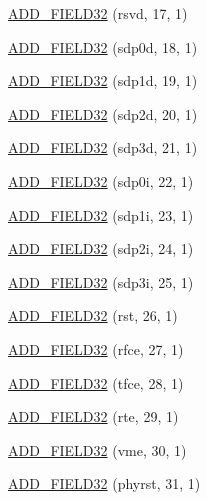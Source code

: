\begin{DoxyCompactItemize}
\item 
\hyperlink{structiGbReg_1_1Regs_1_1CTRL_aefe3435f854e5eab707963b9c17ee7dd}{ADD\_\-FIELD32} (rsvd, 17, 1)
\item 
\hyperlink{structiGbReg_1_1Regs_1_1CTRL_af883c5c203e7a3b3d2c90f09d170f606}{ADD\_\-FIELD32} (sdp0d, 18, 1)
\item 
\hyperlink{structiGbReg_1_1Regs_1_1CTRL_af2c539f57827e3b2b0797a81f65106ce}{ADD\_\-FIELD32} (sdp1d, 19, 1)
\item 
\hyperlink{structiGbReg_1_1Regs_1_1CTRL_a54c105546e8a2156dd56edb0752f64d8}{ADD\_\-FIELD32} (sdp2d, 20, 1)
\item 
\hyperlink{structiGbReg_1_1Regs_1_1CTRL_a0022deedfd2646b56a4f6ac641d7987b}{ADD\_\-FIELD32} (sdp3d, 21, 1)
\item 
\hyperlink{structiGbReg_1_1Regs_1_1CTRL_add00dec2b83a0c1cc0bdbda8f34e13f8}{ADD\_\-FIELD32} (sdp0i, 22, 1)
\item 
\hyperlink{structiGbReg_1_1Regs_1_1CTRL_a0a96672040caa9b4f6e44ec460c7341c}{ADD\_\-FIELD32} (sdp1i, 23, 1)
\item 
\hyperlink{structiGbReg_1_1Regs_1_1CTRL_aa75ee0462d25c712117799531ffa1fd6}{ADD\_\-FIELD32} (sdp2i, 24, 1)
\item 
\hyperlink{structiGbReg_1_1Regs_1_1CTRL_ab13db9bd708fd888664ee4c032374751}{ADD\_\-FIELD32} (sdp3i, 25, 1)
\item 
\hyperlink{structiGbReg_1_1Regs_1_1CTRL_a39b6f6d583685bf71528f28ea5e999e1}{ADD\_\-FIELD32} (rst, 26, 1)
\item 
\hyperlink{structiGbReg_1_1Regs_1_1CTRL_abe2e20e818ee6b65b53c7466537f9e12}{ADD\_\-FIELD32} (rfce, 27, 1)
\item 
\hyperlink{structiGbReg_1_1Regs_1_1CTRL_ab19d665c34f9aff5c7ec45cba730f088}{ADD\_\-FIELD32} (tfce, 28, 1)
\item 
\hyperlink{structiGbReg_1_1Regs_1_1CTRL_ab915cd16c11039f48ba2c8c35210db9d}{ADD\_\-FIELD32} (rte, 29, 1)
\item 
\hyperlink{structiGbReg_1_1Regs_1_1CTRL_a64a2b50361301ad919e2543b52afa760}{ADD\_\-FIELD32} (vme, 30, 1)
\item 
\hyperlink{structiGbReg_1_1Regs_1_1CTRL_a8fa3ed9a7074814a253272af063fcb45}{ADD\_\-FIELD32} (phyrst, 31, 1)
\end{DoxyCompactItemize}


